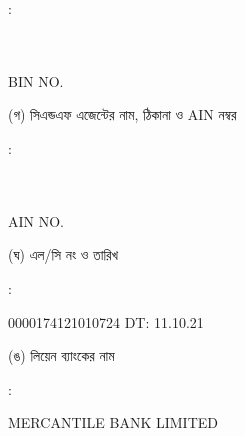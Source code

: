 \documentclass[12pt]{article}
\newcommand{\lcno}{0000174121010724}
\newcommand{\lcdt}{11.10.21}
\newcommand{\lienbank}{MERCANTILE BANK LIMITED}
\newcommand{\impn}{\jdwl}
\newcommand{\impadd}{\jdwla}
\newcommand{\impbin}{}
\begin{document}
\begin{minipage}[t]{0.02\linewidth}
:
\end{minipage}
\begin{minipage}[t]{0.53\linewidth}
\textbf{{\impn}}
\\
{\impadd}
\\
BIN NO. {\impbin}
\\
\end{minipage}
\begin{minipage}[t]{0.05\linewidth}
\hspace*{1em}
\end{minipage}
\begin{minipage}[t]{0.40\linewidth}
(গ) সিএন্ডএফ এজেন্টের নাম, ঠিকানা
ও AIN নম্বর
\end{minipage}
\begin{minipage}[t]{0.02\linewidth}
:
\end{minipage}
\begin{minipage}[t]{0.53\linewidth}
\textbf{{\cnfn}}
\\
{\cnfadd}
\\
AIN NO. {\cnfain}
\\
\end{minipage}
\begin{minipage}[t]{0.05\linewidth}
\hspace*{1em}
\end{minipage}
\begin{minipage}[t]{0.40\linewidth}
(ঘ) এল/সি নং ও তারিখ
\end{minipage}
\begin{minipage}[t]{0.02\linewidth}
:
\end{minipage}
\begin{minipage}[t]{0.53\linewidth}
{\lcno} \hspace{2em} DT: {\lcdt}
\\
\end{minipage}
\begin{minipage}[t]{0.05\linewidth}
\hspace*{1em}
\end{minipage}
\begin{minipage}[t]{0.40\linewidth}
(ঙ) লিয়েন ব্যাংকের নাম
\end{minipage}
\begin{minipage}[t]{0.02\linewidth}
:
\end{minipage}
\begin{minipage}[t]{0.53\linewidth}
{\lienbank}
\\
\end{minipage}
\end{document}
